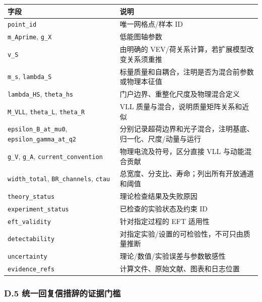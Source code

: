 \documentclass[
  chinese,
  UTF8]{ctexart}
\newcounter{none} %
\begin{document}
{\def\LTcaptype{none} %
\begin{longtable}[]{@{}
  >{\raggedright\arraybackslash}p{}
  >{\raggedright\arraybackslash}p{}@{}}
\toprule\noalign{}
\begin{minipage}[b]{\linewidth}\raggedright
字段
\end{minipage} & \begin{minipage}[b]{\linewidth}\raggedright
说明
\end{minipage} \\
\midrule\noalign{}
\endhead
\bottomrule\noalign{}
\endlastfoot
\texttt{point\_id} & 唯一网格点/样本 ID \\
\texttt{m\_Aprime}, \texttt{g\_X} & 低能图轴参数 \\
\texttt{v\_S} & 由明确的 VEV/荷关系计算，若扩展模型改变关系须重推 \\
\texttt{m\_s}, \texttt{lambda\_S} &
标量质量和自耦合，注明是否为混合前参数或物理本征值 \\
\texttt{lambda\_HS}, \texttt{theta\_hs} &
门户边界、重整化尺度及物理混合定义 \\
\texttt{M\_VLL}, \texttt{theta\_L}, \texttt{theta\_R} & VLL
质量与混合，说明质量矩阵关系和近似 \\
\texttt{epsilon\_B\_at\_mu0}, \texttt{epsilon\_gamma\_at\_q2} &
分别记录超荷边界和光子混合，注明基底、归一化、尺度/动量与运行 \\
\texttt{g\_V}, \texttt{g\_A}, \texttt{current\_convention} &
物理电流及符号，区分直接 VLL 与动能混合贡献 \\
\texttt{width\_total}, \texttt{BR\_channels}, \texttt{ctau} &
总宽度、分支比、寿命；列出所有开放通道和阈值 \\
\texttt{theory\_status} & 理论检查结果及失败原因 \\
\texttt{experiment\_status} & 已检查的实验状态及约束 ID \\
\texttt{eft\_validity} & 针对指定过程的 EFT 适用性 \\
\texttt{detectability} & 对指定实验/设置的可检验性，不可只由质量推断 \\
\texttt{uncertainty} & 理论/数值/实验误差与参数敏感性 \\
\texttt{evidence\_refs} & 计算文件、原始文献、图表和日志位置 \\
\end{longtable}
}

\subsubsection{D.5
统一回复信措辞的证据门槛}\label{d.5-ux7edfux4e00ux56deux590dux4fe1ux63aaux8f9eux7684ux8bc1ux636eux95e8ux69db}
\end{document}

